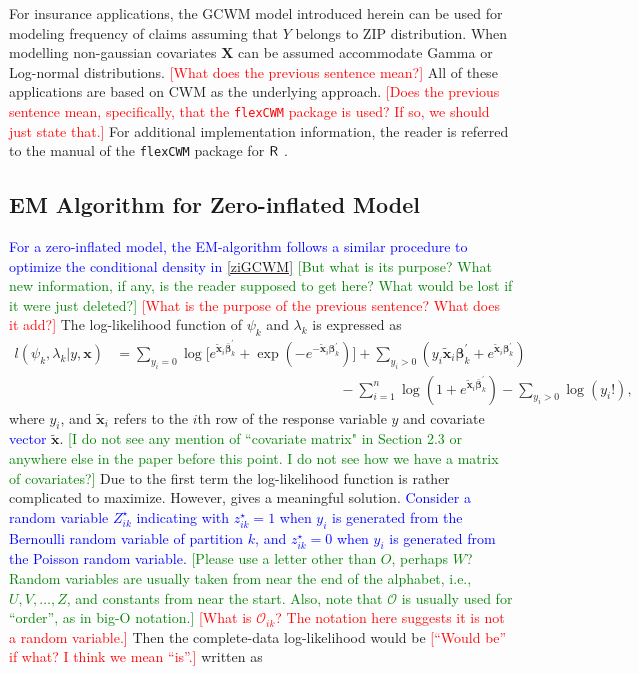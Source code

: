 \documentclass[11pt,letterpaper]{article}
\numberwithin{equation}{section}
\numberwithin{equation}{section}
\numberwithin{equation}{section}
\newcommand{\xTilda}{\tilde{\bm{x}}}
\newcommand{\zZ}{Z^\star}
\newcommand{\zz}{z^\star}
\begin{document}
For insurance applications, the GCWM model introduced herein can be used for modeling frequency of claims assuming that $Y$ belongs to ZIP distribution. When modelling  non-gaussian covariates $\bm{X}$ can be assumed accommodate Gamma or Log-normal distributions. \textcolor{red}{[What does the previous sentence mean?]} All of these applications are based on CWM as the underlying approach. \textcolor{red}{[Does the previous sentence mean, specifically, that the {\tt flexCWM} package is used? If so, we should just state that.]} For additional implementation information, the reader is referred to the manual of the {\tt flexCWM} package \citep{Ingrassia+Punzo+Vittadini+Minotti:2015} for ${\sf R}$ \citep{R18}.

\subsection{EM Algorithm for Zero-inflated Model} 
\textcolor{blue}{For a zero-inflated model, the EM-algorithm follows a similar procedure to optimize the conditional density in \eqref{ziGCWM} }  \textcolor{green}{[But what is its purpose? What new information, if any, is the reader supposed to get here? What would be lost if it were just deleted?]} \textcolor{red}{[What is the purpose of the previous sentence? What does it add?]} The log-likelihood function of $\psi_k$ and $\lambda_k$ is expressed as
\begin{equation*}\begin{split}
l(\psi_k,\lambda_k|y,\bm{x}) &= \sum_{y_i = 0} \log \big[ e^{ \bm{ \xTilda}_i \bm{\bar{\beta}}_k^{'}  } + \exp{( - e^ { -\bm{\xTilda}_i \bm{\beta}_k^{'} })} \big] + \sum_{y_i > 0 } \left( y_i \xTilda_i \bm{\beta}_k^{'} + e^{ \xTilda_i \bm{\beta}_k^{'} } \right)\\ &\qquad\qquad\qquad\qquad\qquad\qquad\qquad\qquad- \sum_{i=1}^n  \log \left(1 + e^ {\xTilda_i \bm{\bar{\beta}}_k^{'} } \right) - \sum_{y_i > 0} \log(y_i ! ),
\end{split}\end{equation*}
where $y_i$, and $\xTilda_i$ refers to the $i$th row of the response variable $y$ and covariate \textcolor{blue}{vector} $\xTilda$. \textcolor{green}{[I do not see any mention of ``covariate matrix" in Section 2.3 or anywhere else in the paper before this point. I do not see how we have a matrix of covariates?]}  Due to the first term the log-likelihood function is rather complicated to maximize. However, \cite{Lambert} gives a meaningful solution. \textcolor{blue}{ Consider a random variable $\zZ_{ik}$ indicating with ${\zz_{ik}} = 1$ when $y_i$ is generated from the Bernoulli random variable of partition $k$, and $\zz_{ik} = 0$ when $y_i$ is generated from the Poisson random variable.} \textcolor{green}{[Please use a letter other than $O$, perhaps $W$? Random variables are usually taken from near the end of the alphabet, i.e., $U,V,\ldots,Z$, and constants from near the start. Also, note that $\mathcal{O}$ is usually used for ``order'', as in big-O notation.]} \textcolor{red}{[What is ${\mathcal{O}_{ik}}$? The notation here suggests it is not a random variable.]}  Then the complete-data log-likelihood would be \textcolor{red}{[``Would be'' if what? I think we mean ``is''.]} written as
\end{document}
